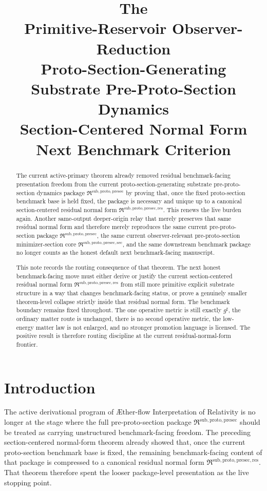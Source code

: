 \documentclass[11pt]{article}
\title{\textbf{The \TheoryName{}}\\[0.4em]
\large Primitive-Reservoir Observer-Reduction\\
\large Proto-Section-Generating Substrate Pre-Proto-Section Dynamics\\
\large Section-Centered Normal Form Next Benchmark Criterion}
\author{}
\date{}
\newcommand{\Aflow}{\AE{}ther-flow}
\newcommand{\TheoryName}{\Aflow{} Interpretation of Relativity}
\newcommand{\CompletedMetric}{g^{\sharp}}
\newcommand{\PreProtoSectionPackage}{\mathfrak R^{\mathrm{sub,proto,presec}}}
\newcommand{\PreProtoSectionMinSectionCore}{\mathfrak R^{\mathrm{sub,proto,presec,sec}}}
\newcommand{\PreProtoSectionResidualPackage}{\mathfrak R^{\mathrm{sub,proto,presec,res}}}
\begin{document}
\maketitle

\begin{abstract}
The current active-primary theorem already removed residual benchmark-facing presentation freedom from the current proto-section-generating substrate pre-proto-section dynamics package \(\PreProtoSectionPackage\) by proving that, once the fixed proto-section benchmark base is held fixed, the package is necessary and unique up to a canonical section-centered residual normal form \(\PreProtoSectionResidualPackage\). This renews the live burden again. Another same-output deeper-origin relay that merely preserves that same residual normal form and therefore merely reproduces the same current pre-proto-section package \(\PreProtoSectionPackage\), the same current observer-relevant pre-proto-section minimizer-section core \(\PreProtoSectionMinSectionCore\), and the same downstream benchmark package no longer counts as the honest default next benchmark-facing manuscript.

This note records the routing consequence of that theorem. The next honest benchmark-facing move must either derive or justify the current section-centered residual normal form \(\PreProtoSectionResidualPackage\) from still more primitive explicit substrate structure in a way that changes benchmark-facing status, or prove a genuinely smaller theorem-level collapse strictly inside that residual normal form. The benchmark boundary remains fixed throughout. The one operative metric is still exactly \(\CompletedMetric\), the ordinary matter route is unchanged, there is no second operative metric, the low-energy matter law is not enlarged, and no stronger promotion language is licensed. The positive result is therefore routing discipline at the current residual-normal-form frontier.
\end{abstract}

\section{Introduction}

The active derivational program of \TheoryName{} is no longer at the stage where the full pre-proto-section package \(\PreProtoSectionPackage\) should be treated as carrying unstructured benchmark-facing freedom. The preceding section-centered normal-form theorem already showed that, once the current proto-section benchmark base is fixed, the remaining benchmark-facing content of that package is compressed to a canonical residual normal form \(\PreProtoSectionResidualPackage\). That theorem therefore spent the looser package-level presentation as the live stopping point.
\end{document}
